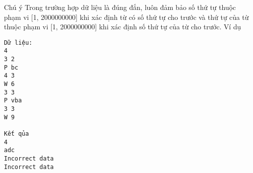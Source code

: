 Chú ý  
Trong trường hợp dữ liệu là đúng đắn, luôn đảm bảo số thứ tự thuộc phạm vi [1, 2000000000] khi xác định từ có số thứ tự cho trước và thứ tự của từ thuộc phạm vi [1, 2000000000] khi xác định số thứ tự của từ cho trước.
   Ví dụ  
\begin{verbatim}
Dữ liệu:
4
3 2
P bc
4 3
W 6
3 3
P vba
3 3
W 9

Kết qủa
4
adc
Incorrect data
Incorrect data
\end{verbatim}